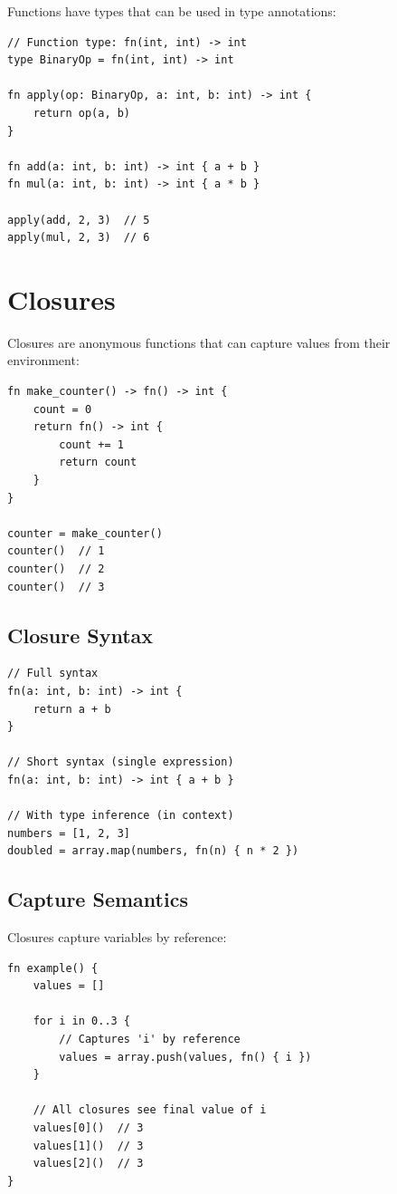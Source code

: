 Functions have types that can be used in type annotations:

\begin{lstlisting}
// Function type: fn(int, int) -> int
type BinaryOp = fn(int, int) -> int

fn apply(op: BinaryOp, a: int, b: int) -> int {
    return op(a, b)
}

fn add(a: int, b: int) -> int { a + b }
fn mul(a: int, b: int) -> int { a * b }

apply(add, 2, 3)  // 5
apply(mul, 2, 3)  // 6
\end{lstlisting}

\section{Closures}

Closures are anonymous functions that can capture values from their environment:

\begin{lstlisting}
fn make_counter() -> fn() -> int {
    count = 0
    return fn() -> int {
        count += 1
        return count
    }
}

counter = make_counter()
counter()  // 1
counter()  // 2
counter()  // 3
\end{lstlisting}

\subsection{Closure Syntax}

\begin{lstlisting}
// Full syntax
fn(a: int, b: int) -> int {
    return a + b
}

// Short syntax (single expression)
fn(a: int, b: int) -> int { a + b }

// With type inference (in context)
numbers = [1, 2, 3]
doubled = array.map(numbers, fn(n) { n * 2 })
\end{lstlisting}

\subsection{Capture Semantics}

Closures capture variables by reference:

\begin{lstlisting}
fn example() {
    values = []

    for i in 0..3 {
        // Captures 'i' by reference
        values = array.push(values, fn() { i })
    }

    // All closures see final value of i
    values[0]()  // 3
    values[1]()  // 3
    values[2]()  // 3
}
\end{lstlisting}

